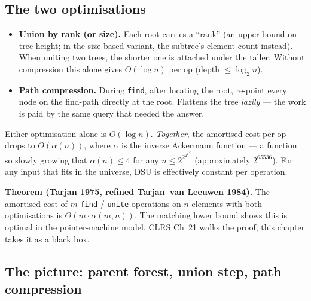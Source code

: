 \documentclass[11pt]{article}
\begin{document}
\subsection*{The two optimisations}

\begin{itemize}[leftmargin=*]
    \item \textbf{Union by rank (or size).} Each root carries a
          ``rank'' (an upper bound on tree height; in the
          size-based variant, the subtree's element count
          instead). When uniting two trees, the shorter one is
          attached under the taller. Without compression this
          alone gives $O(\log n)$ per op (depth $\le \log_2 n$).
    \item \textbf{Path compression.} During \texttt{find}, after
          locating the root, re-point every node on the find-path
          directly at the root. Flattens the tree
          \emph{lazily} --- the work is paid by the same query
          that needed the answer.
\end{itemize}

Either optimisation alone is $O(\log n)$. \emph{Together}, the
amortised cost per op drops to $O(\alpha(n))$, where $\alpha$ is
the inverse Ackermann function --- a function so slowly growing
that $\alpha(n) \le 4$ for any $n \le 2^{2^{2^{2^{16}}}}$
(approximately $2^{65536}$). For any input that fits in the
universe, DSU is effectively constant per operation.

\textbf{Theorem (Tarjan 1975, refined Tarjan--van Leeuwen 1984).}
The amortised cost of $m$ \texttt{find} / \texttt{unite}
operations on $n$ elements with both optimisations is
$\Theta(m \cdot \alpha(m, n))$. The matching lower bound shows
this is optimal in the pointer-machine model. CLRS Ch~21 walks
the proof; this chapter takes it as a black box.

\subsection*{The picture: parent forest, union step, path compression}
\end{document}

